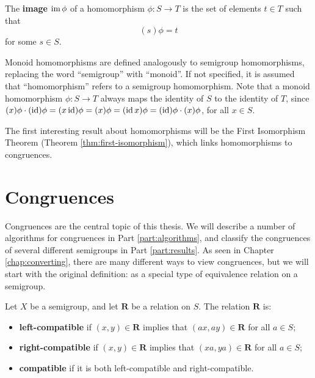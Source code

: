 \begin{definition}
  \label{def:image}
  The \textbf{image} $\operatorname{im}\phi$ of a homomorphism $\phi:S \to T$ is the set of
  elements $t \in T$ such that
  $$(s)\phi = t$$
  for some $s \in S$.
\end{definition}

Monoid homomorphisms are defined analogously to semigroup homomorphisms,
replacing the word ``semigroup'' with ``monoid''.  If not specified, it is
assumed that ``homomorphism'' refers to a semigroup homomorphism.  Note that a
monoid homomorphism $\phi:S \to T$ always maps the identity of $S$ to the
identity of $T$, since
$(x)\phi \cdot (\operatorname{id})\phi
= (x \operatorname{id})\phi
= (x)\phi
= (\operatorname{id} x)\phi
= (\operatorname{id})\phi \cdot (x)\phi$,
for all $x \in S$.

The first interesting result about homomorphisms will be the First Isomorphism
Theorem (Theorem \ref{thm:first-isomorphism}), which links homomorphisms to
congruences.

\section{Congruences}
\label{sec:intro-congs}

Congruences are the central topic of this thesis.  We will describe a number of
algorithms for congruences in Part \ref{part:algorithms}, and classify the
congruences of several different semigroups in Part \ref{part:results}.
As seen in Chapter \ref{chap:converting}, there are many different ways to view
congruences, but we will start with the original definition: as a special type
of equivalence relation on a semigroup.

\begin{definition}
  \label{def:compatible}
  Let $X$ be a semigroup, and let $\mathbf{R}$ be a relation on $S$.  The
  relation $\mathbf{R}$ is:
  \begin{itemize}
  \item \textbf{left-compatible} if $(x, y) \in \mathbf{R}$ implies that
    $(ax, ay) \in \mathbf{R}$ for all $a \in S$;
  \item \textbf{right-compatible} if $(x, y) \in \mathbf{R}$ implies that
    $(xa, ya) \in \mathbf{R}$ for all $a \in S$;
  \item \textbf{compatible} if it is both left-compatible and
    right-compatible.
  \end{itemize}
\end{definition}

